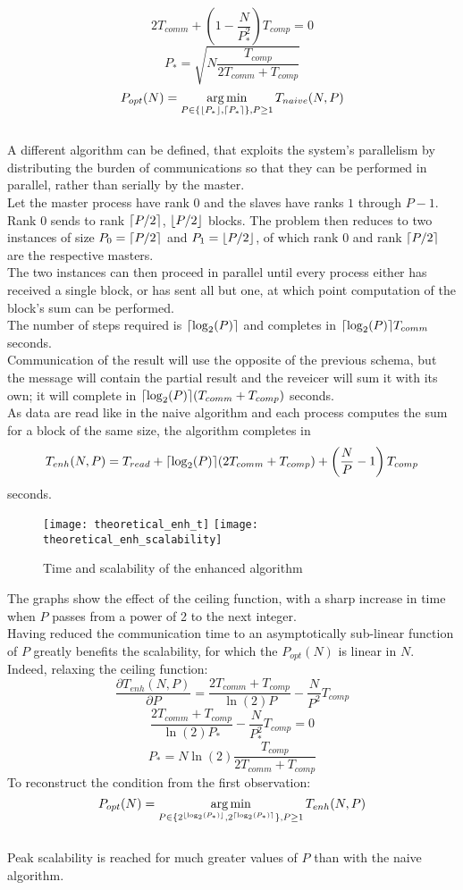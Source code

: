 \documentclass[a4paper, 11pt, twoside, openright]{article}
\DeclareMathOperator*{\argmin}{arg\,min}
\DeclarePairedDelimiter{\ceil}{\lceil}{\rceil}
\DeclarePairedDelimiter{\floor}{\lfloor}{\rfloor}
\begin{document}
$$2T_{comm} + \left(1-\frac{N}{P_{*}^{2}}\right)T_{comp} = 0$$
$$P_{*} = \sqrt{N\frac{T_{comp}}{2T_{comm} + T_{comp}}}$$
$$P_{opt}(N) = \argmin_{P \in \{ \floor{P_{*}}, \ceil{P_{*}} \}, P \geq 1 }{T_{naive}(N, P)} $$\\
A different algorithm can be defined, that exploits the system's parallelism by distributing the burden of communications so that they can be performed in parallel, rather than serially by the master.\\
Let the master process have rank $0$ and the slaves have ranks $1$ through $P-1$.\\
Rank $0$ sends to rank $\ceil*{P/2}$, $\floor*{P/2}$ blocks. The problem then reduces to two instances of size $P_{0}=\ceil*{P/2}$ and $P_{1}=\floor*{P/2}$, of which rank $0$ and rank $\ceil*{P/2}$ are the respective masters.\\
The two instances can then proceed in parallel until every process either has received a single block, or has sent all but one, at which point computation of the block's sum can be performed.\\
The number of steps required is $\ceil*{\log_{2}(P)}$ and completes in $\ceil*{\log_{2}(P)}T_{comm}$ seconds.\\
Communication of the result will use the opposite of the previous schema, but the message will contain the partial result and the reveicer will sum it with its own; it will complete in $\ceil*{\log_{2}(P)}(T_{comm} + T_{comp})$ seconds.\\
As data are read like in the naive algorithm and each process computes the sum for a block of the same size, the algorithm completes in
$$T_{enh}(N, P) = T_{read} + \ceil*{\log_{2}(P)} (2T_{comm} + T_{comp}) + \left(\frac{N}{P}-1\right)T_{comp}$$
seconds.\\
\begin{figure}[h]
    \texttt{[image: theoretical\_enh\_t]}
    \texttt{[image: theoretical\_enh\_scalability]}
    \caption{Time and scalability of the enhanced algorithm}
\end{figure}
\FloatBarrier
The graphs show the effect of the ceiling function, with a sharp increase in time when $P$ passes from a power of 2 to the next integer.\\
Having reduced the communication time to an asymptotically sub-linear function of $P$ greatly benefits the scalability, for which the $P_{opt}(N)$ is linear in $N$.\\
Indeed, relaxing the ceiling function:
$$\frac{\partial T_{enh}(N, P)}{\partial P} = \frac{2T_{comm} + T_{comp}}{\ln(2)P} -\frac{N}{P^{2}} T_{comp}$$
$$\frac{2T_{comm} + T_{comp}}{\ln(2)P_{*}} - \frac{N}{P_{*}^{2}} T_{comp} = 0$$
$$P_{*} = N\ln(2)\frac{T_{comp}}{2T_{comm} + T_{comp}}$$
To reconstruct the condition from the first observation:
$$P_{opt}(N) = \argmin_{P \in \{ 2^{\floor{\log_2(P_{*})}}, 2^{\ceil{\log_2(P_{*})}} \}, P \geq 1}{T_{enh}(N, P)} $$\\
Peak scalability is reached for much greater values of $P$ than with the naive algorithm.\\
\end{document}
